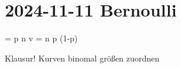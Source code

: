 \section{2024-11-11 Bernoulli}

\startformula
\startalign
\NC \mu \NC = p \cdot n \NR
\NC v \NC = n \cdot p \cdot (1-p) \NR
\stopalign
\stopformula

\startframedtipp
Klausur!
Kurven binomal größen zuordnen
\stopframedtipp
